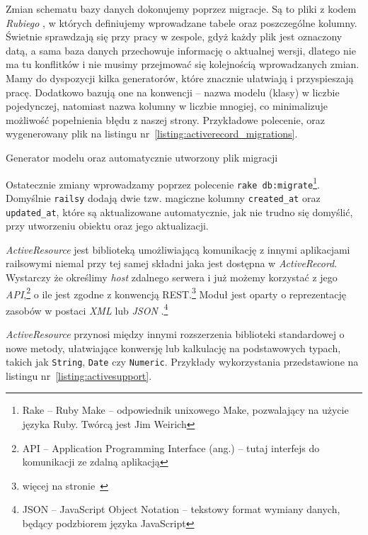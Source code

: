 \documentclass[a4paper,12pt]{article}
\begin{document}
Zmian schematu bazy danych dokonujemy poprzez migracje. Są to pliki z kodem \emph{Rubiego
}, w których definiujemy wprowadzane tabele oraz poszczególne kolumny. Świetnie sprawdzają
się przy pracy w zespole, gdyż każdy plik jest oznaczony datą, a sama baza danych
przechowuje informację o aktualnej wersji, dlatego nie ma tu konflitków i nie musimy
przejmować się kolejnością wprowadzanych zmian. Mamy do dyspozycji kilka generatorów,
które znacznie ułatwiają i przyspieszają pracę. Dodatkowo bazują one na konwencji -- nazwa
modelu (klasy) w liczbie pojedynczej, natomiast nazwa kolumny w liczbie mnogiej, co
minimalizuje możliwość popełnienia błędu z naszej strony. Przykładowe polecenie, oraz
wygenerowany plik na listingu nr~\ref{listing:activerecord_migrations}.

\begin{listing}
  
  \caption{Generator modelu oraz automatycznie utworzony plik migracji}
  \label{listing:activerecord_migrations}
\end{listing}


Ostatecznie zmiany wprowadzamy poprzez polecenie \texttt{rake db:migrate}\footnote{Rake --
Ruby Make -- odpowiednik unixowego Make, pozwalający na użycie języka Ruby. Twórcą
jest Jim Weirich}. Domyślnie \texttt{railsy} dodają dwie tzw. magiczne kolumny
\texttt{created\_at} oraz \texttt{updated\_at}, które są aktualizowane automatycznie, jak
nie trudno się domyślić, przy utworzeniu obiektu oraz jego aktualizacji.


\emph{ActiveResource} jest biblioteką umożliwiającą komunikację z innymi
aplikacjami railsowymi niemal przy tej samej składni jaka jest dostępna w \emph
{ActiveRecord}. Wystarczy że określimy \emph{host} zdalnego serwera i już
możemy korzystać z jego \emph{API},\footnote{API -- Application Programming
Interface (ang.) -- tutaj interfejs do komunikacji ze zdalną aplikacją} o ile
jest zgodne z konwencją REST.\footnote{więcej na stronie~\pageref{sec:rest}}
Moduł jest oparty o reprezentację zasobów w postaci \emph{XML} lub \emph{JSON
}.\footnote{JSON -- JavaScript Object Notation -- tekstowy format wymiany
danych, będący podzbiorem języka JavaScript}


\emph{ActiveResource} przynosi między innymi rozszerzenia biblioteki
standardowej o nowe metody, ułatwiające konwersję lub kalkulację na podstawowych
typach, takich jak \texttt{String}, \texttt{Date} czy \texttt{Numeric}. Przykłady
wykorzystania przedstawione na listingu nr~\ref{listing:activesupport}.
\end{document}
